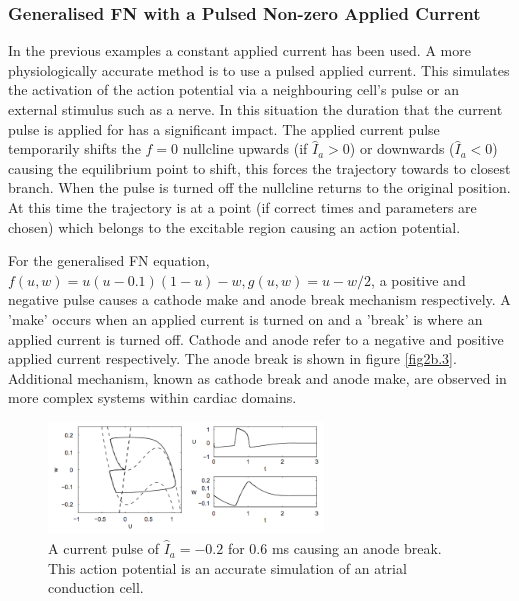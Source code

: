     \subsubsection{Generalised FN with a Pulsed Non-zero Applied Current}
    In the previous examples a constant applied current has been used. A more physiologically accurate method is to use a pulsed applied current. This simulates the activation of the action potential via a neighbouring cell's pulse or an external stimulus such as a nerve. In this situation the duration that the current pulse is applied for has a significant impact. The applied current pulse temporarily shifts the $f=0$ nullcline upwards (if $\hat I_a >0$) or downwards ($\hat I_a <0$) causing the equilibrium point to shift, this forces the trajectory towards to closest branch. When the pulse is turned off the nullcline returns to the original position. At this time the trajectory is at a point (if correct times and parameters are chosen) which belongs to the excitable region causing an action potential. \par 
    For the generalised FN equation, $f(u,w)=u(u-0.1)(1-u)-w,  g(u,w)=u-w/2$, a positive and negative pulse causes a cathode make and anode break mechanism respectively. A 'make' occurs when an applied current is turned on and a 'break' is where an applied current is turned off. Cathode and anode refer to a negative and positive applied current respectively. The anode break is shown in figure \ref{fig2b.3}. Additional mechanism, known as cathode break and anode make, are observed in more complex systems within cardiac domains. 
    \begin{figure}
        \centering
        \includegraphics[width=0.65\textwidth]{images/Iperiod.png}
        \caption{A current pulse of $\hat I_a=-0.2$ for 0.6 ms causing an anode break. This action potential is an accurate simulation of an atrial conduction cell. \citep{ecg}}
        \label{fig2b.4}
    \end{figure}
